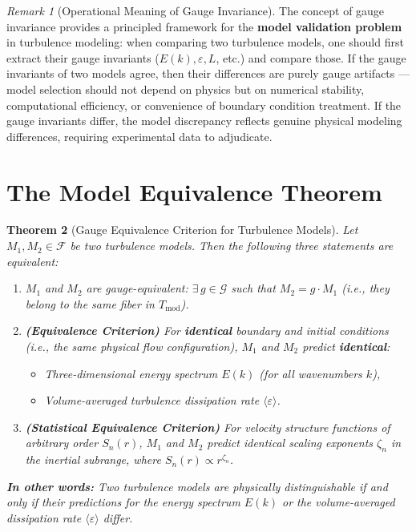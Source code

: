 \documentclass[12pt,a4paper]{article}
\theoremstyle{plain}
\newtheorem{theorem}{Theorem}[section]
\theoremstyle{definition}
\theoremstyle{remark}
\newtheorem{remark}[theorem]{Remark}
\newcommand{\F}{\mathcal{F}}
\newcommand{\G}{\mathcal{G}}
\newcommand{\Tmod}{T_{\text{mod}}}
\newcommand{\eps}{\varepsilon}
\newcommand{\avg}[1]{\langle #1 \rangle}
\begin{document}
\begin{remark}[Operational Meaning of Gauge Invariance]
The concept of gauge invariance provides a principled framework for the \textbf{model validation problem} in turbulence modeling: when comparing two turbulence models, one should first extract their gauge invariants ($E(k), \eps, L$, etc.) and compare those. If the gauge invariants of two models agree, then their differences are purely gauge artifacts --- model selection should not depend on physics but on numerical stability, computational efficiency, or convenience of boundary condition treatment. If the gauge invariants differ, the model discrepancy reflects genuine physical modeling differences, requiring experimental data to adjudicate.
\end{remark}

\section{The Model Equivalence Theorem}

\begin{theorem}[Gauge Equivalence Criterion for Turbulence Models]\label{thm:equiv}
Let $M_1, M_2 \in \F$ be two turbulence models. Then the following three statements are equivalent:

\begin{enumerate}[label=\textbf{(E\arabic*)}]
    \item $M_1$ and $M_2$ are gauge-equivalent: $\exists\, g\in\G$ such that $M_2 = g\cdot M_1$ (i.e., they belong to the same fiber in $\Tmod$).
    \item \textbf{(Equivalence Criterion)} For \textbf{identical} boundary and initial conditions (i.e., the same physical flow configuration), $M_1$ and $M_2$ predict \textbf{identical}:
    \begin{itemize}
        \item Three-dimensional energy spectrum $E(k)$ (for all wavenumbers $k$),
        \item Volume-averaged turbulence dissipation rate $\avg{\eps}$.
    \end{itemize}
    \item \textbf{(Statistical Equivalence Criterion)} For velocity structure functions of arbitrary order $S_n(r)$, $M_1$ and $M_2$ predict identical scaling exponents $\zeta_n$ in the inertial subrange, where $S_n(r) \propto r^{\zeta_n}$.
\end{enumerate}

\textbf{In other words:} Two turbulence models are physically distinguishable if and only if their predictions for the energy spectrum $E(k)$ or the volume-averaged dissipation rate $\avg{\eps}$ differ.
\end{theorem}
\end{document}
